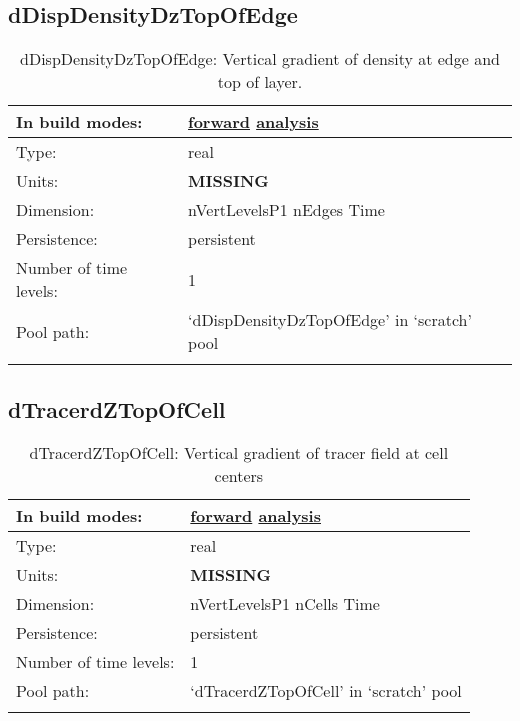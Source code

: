 \subsection[dDispDensityDzTopOfEdge]{dDispDensityDzTopOfEdge}
\label{subsec:var_sec_scratch_dDispDensityDzTopOfEdge}
\begin{center}
\begin{longtable}{| p{2.0in} | p{4.0in} |}
        \hline 
        In build modes: & \hyperref[subsec:forward_var_tab_scratch]{forward} \hyperref[subsec:analysis_var_tab_scratch]{analysis} \\
        \hline 
        Type: & real \\
        \hline 
        Units: & {\bf \color{red} MISSING} \\
        \hline 
        Dimension: & nVertLevelsP1 nEdges Time \\
        \hline 
        Persistence: & persistent \\
        \hline 
        Number of time levels: & 1 \\
        \hline 
            Pool path: & `dDispDensityDzTopOfEdge' in `scratch' pool \\
		 \hline 
    \caption{dDispDensityDzTopOfEdge: Vertical gradient of density at edge and top of layer.}
\end{longtable}
\end{center}
\subsection[dTracerdZTopOfCell]{dTracerdZTopOfCell}
\label{subsec:var_sec_scratch_dTracerdZTopOfCell}
\begin{center}
\begin{longtable}{| p{2.0in} | p{4.0in} |}
        \hline 
        In build modes: & \hyperref[subsec:forward_var_tab_scratch]{forward} \hyperref[subsec:analysis_var_tab_scratch]{analysis} \\
        \hline 
        Type: & real \\
        \hline 
        Units: & {\bf \color{red} MISSING} \\
        \hline 
        Dimension: & nVertLevelsP1 nCells Time \\
        \hline 
        Persistence: & persistent \\
        \hline 
        Number of time levels: & 1 \\
        \hline 
            Pool path: & `dTracerdZTopOfCell' in `scratch' pool \\
		 \hline 
    \caption{dTracerdZTopOfCell: Vertical gradient of tracer field at cell centers}
\end{longtable}
\end{center}
